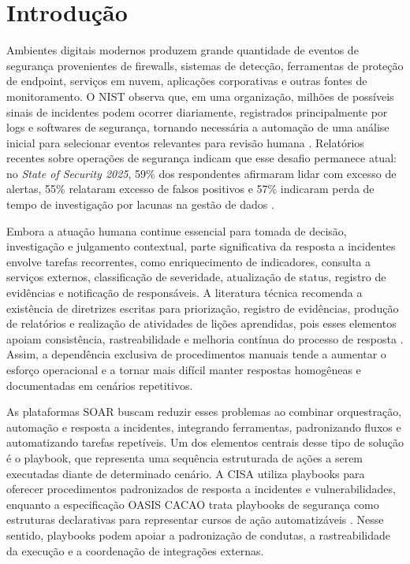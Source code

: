 \documentclass[article,a4paper,12pt,english,brazil,sumario=tradicional]{abntex2}
\begin{document}
\section{Introdução}

Ambientes digitais modernos produzem grande quantidade de eventos de segurança provenientes de firewalls, sistemas de detecção, ferramentas de proteção de endpoint, serviços em nuvem, aplicações corporativas e outras fontes de monitoramento. O NIST observa que, em uma organização, milhões de possíveis sinais de incidentes podem ocorrer diariamente, registrados principalmente por logs e softwares de segurança, tornando necessária a automação de uma análise inicial para selecionar eventos relevantes para revisão humana \cite{nist2012}. Relatórios recentes sobre operações de segurança indicam que esse desafio permanece atual: no \textit{State of Security 2025}, 59\% dos respondentes afirmaram lidar com excesso de alertas, 55\% relataram excesso de falsos positivos e 57\% indicaram perda de tempo de investigação por lacunas na gestão de dados \cite{splunk2025,cisco2025Security}.

Embora a atuação humana continue essencial para tomada de decisão, investigação e julgamento contextual, parte significativa da resposta a incidentes envolve tarefas recorrentes, como enriquecimento de indicadores, consulta a serviços externos, classificação de severidade, atualização de status, registro de evidências e notificação de responsáveis. A literatura técnica recomenda a existência de diretrizes escritas para priorização, registro de evidências, produção de relatórios e realização de atividades de lições aprendidas, pois esses elementos apoiam consistência, rastreabilidade e melhoria contínua do processo de resposta \cite{nist2012,nist2025}. Assim, a dependência exclusiva de procedimentos manuais tende a aumentar o esforço operacional e a tornar mais difícil manter respostas homogêneas e documentadas em cenários repetitivos.

As plataformas SOAR buscam reduzir esses problemas ao combinar orquestração, automação e resposta a incidentes, integrando ferramentas, padronizando fluxos e automatizando tarefas repetíveis. Um dos elementos centrais desse tipo de solução é o playbook, que representa uma sequência estruturada de ações a serem executadas diante de determinado cenário. A CISA utiliza playbooks para oferecer procedimentos padronizados de resposta a incidentes e vulnerabilidades, enquanto a especificação OASIS CACAO trata playbooks de segurança como estruturas declarativas para representar cursos de ação automatizáveis \cite{cisa2021,oasisCacao2023}. Nesse sentido, playbooks podem apoiar a padronização de condutas, a rastreabilidade da execução e a coordenação de integrações externas.
\end{document}
